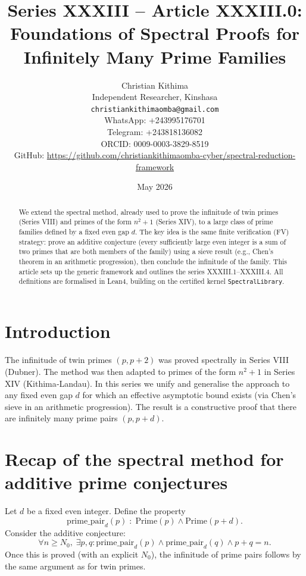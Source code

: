 \documentclass[11pt,a4paper]{article}
\title{Series XXXIII – Article XXXIII.0: Foundations of Spectral Proofs for Infinitely Many Prime Families}
\author{Christian Kithima \\
Independent Researcher, Kinshasa \\
\texttt{christiankithimaomba@gmail.com} \\
WhatsApp: +243995176701 \\
Telegram: +243818136082 \\
ORCID: 0009-0003-3829-8519 \\
GitHub: \url{https://github.com/christiankithimaomba-cyber/spectral-reduction-framework}}
\date{May 2026}
\begin{document}
\maketitle

\begin{abstract}
We extend the spectral method, already used to prove the infinitude of twin primes (Series VIII) and primes of the form \(n^2+1\) (Series XIV), to a large class of prime families defined by a fixed even gap \(d\). The key idea is the same finite verification (FV) strategy: prove an additive conjecture (every sufficiently large even integer is a sum of two primes that are both members of the family) using a sieve result (e.g., Chen's theorem in an arithmetic progression), then conclude the infinitude of the family. This article sets up the generic framework and outlines the series XXXIII.1–XXXIII.4. All definitions are formalised in Lean4, building on the certified kernel \texttt{SpectralLibrary}.
\end{abstract}

\tableofcontents

\section{Introduction}

The infinitude of twin primes \((p,p+2)\) was proved spectrally in Series VIII (Dubner). The method was then adapted to primes of the form \(n^2+1\) in Series XIV (Kithima‑Landau). In this series we unify and generalise the approach to any fixed even gap \(d\) for which an effective asymptotic bound exists (via Chen's sieve in an arithmetic progression). The result is a constructive proof that there are infinitely many prime pairs \((p,p+d)\).

\section{Recap of the spectral method for additive prime conjectures}

Let \(d\) be a fixed even integer. Define the property
\[
\text{prime\_pair}_d(p) \;:\; \text{Prime}(p) \land \text{Prime}(p+d).
\]
Consider the additive conjecture:
\[
\forall n \ge N_0,\; \exists p,q : \text{prime\_pair}_d(p) \land \text{prime\_pair}_d(q) \land p+q = n.
\]
Once this is proved (with an explicit \(N_0\)), the infinitude of prime pairs follows by the same argument as for twin primes.
\end{document}
